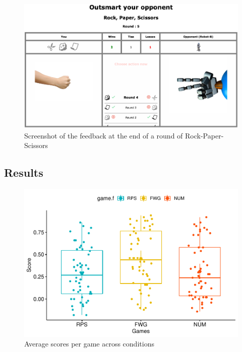 \documentclass[man,floatsintext]{apa6}
\begin{document}
\begin{figure}

{\centering \includegraphics{images/feedback_rps} 

}

\caption{Screenshot of the feedback at the end of a round of Rock-Paper-Scissors}\label{fig:feedback-rps}
\end{figure}

\hypertarget{results}{%
\subsection{Results}\label{results}}

\begin{figure}

{\centering \includegraphics{draft_report_v1_files/figure-latex/exp1-avg-scores-game-1} 

}

\caption{Average scores per game across conditions}\label{fig:exp1-avg-scores-game}
\end{figure}
\end{document}
